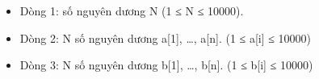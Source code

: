 \begin{itemize}
	\item     Dòng 1: số nguyên dương N (1 ≤ N ≤ 10000).   
	\item     Dòng 2: N số nguyên dương a[1], …, a[n]. (1 ≤ a[i] ≤ 10000)   
	\item     Dòng 3: N số nguyên dương b[1], …, b[n]. (1 ≤ b[i] ≤ 10000)   
\end{itemize}